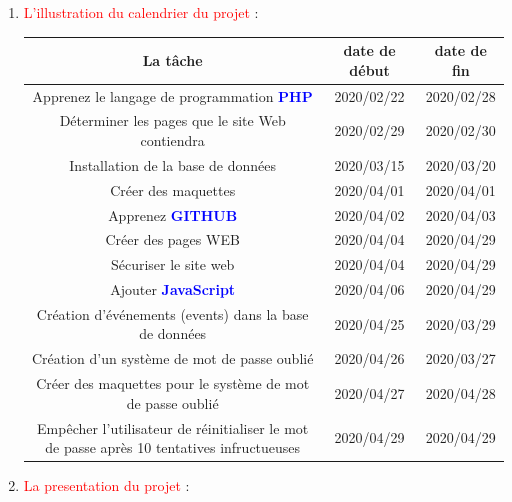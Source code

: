 \documentclass{article}
\begin{document}
\begin{enumerate}
\begin{enumerate}
    \end{enumerate}
   \item \textcolor{red}{\huge L'illustration du calendrier du projet} :  
   \vspace{1.2cm}
   
         \hspace*{-0.9in}
        \begin{tabular}{|c | c | c|}
        \hline
          La tâche & date de début & date de fin\\ 
        \hline
        Apprenez le langage de programmation \textcolor{blue}{\textbf{PHP}} & 2020/02/22 & 2020/02/28 \\ 
        \hline
        Déterminer les pages que le site Web contiendra & 2020/02/29 & 2020/02/30 \\ 
        \hline
        Installation de la base de données & 2020/03/15 & 2020/03/20\\
        \hline
        Créer des maquettes & 2020/04/01  & 2020/04/01\\
        \hline
        Apprenez \textcolor{blue}{\textbf{GITHUB}} & 2020/04/02  & 2020/04/03\\
        \hline
        Créer des pages WEB & 2020/04/04  & 2020/04/29\\
        \hline
        Sécuriser le site web & 2020/04/04  & 2020/04/29\\
        \hline
        Ajouter \textcolor{blue}{\textbf{JavaScript}} & 2020/04/06  & 2020/04/29\\
        \hline
        Création d'événements (events) dans la base de données & 2020/04/25 & 2020/03/29\\
        \hline
         Création d'un système de mot de passe oublié & 2020/04/26 & 2020/03/27\\
        \hline
        Créer des maquettes pour le système de mot de passe oublié & 2020/04/27  & 2020/04/28\\
        \hline
        Empêcher l'utilisateur de réinitialiser le mot de passe après 10 tentatives infructueuses & 2020/04/29  & 2020/04/29\\
        \hline
        \end{tabular}
        
        \vspace{1cm}
  
        
        
        
        
        
        
   \vspace{1cm}
   \item \textcolor{red}{\huge La presentation du projet} :  
   \vspace{0.7cm}
   


\end{enumerate}
\end{document}
